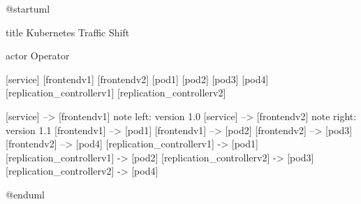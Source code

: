 @startuml

title Kubernetes Traffic Shift

actor Operator

[service]
[frontendv1]
[frontendv2]
[pod1]
[pod2]
[pod3]
[pod4]
[replication_controllerv1]
[replication_controllerv2]

[service] --> [frontendv1]
note left: version 1.0
[service] --> [frontendv2]
note right: version 1.1
[frontendv1] --> [pod1]
[frontendv1] --> [pod2]
[frontendv2] --> [pod3]
[frontendv2] --> [pod4]
[replication_controllerv1] -> [pod1]
[replication_controllerv1] -> [pod2]
[replication_controllerv2] -> [pod3]
[replication_controllerv2] -> [pod4]


@enduml
